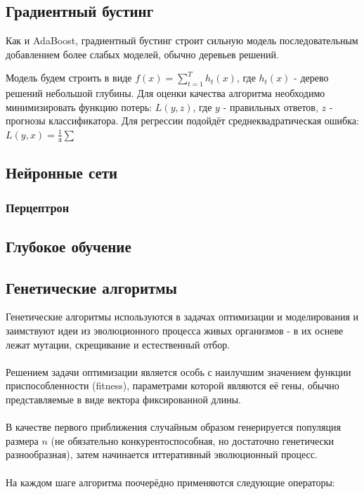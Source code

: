 \documentclass{article}
\begin{document}
    \subsection*{Градиентный бустинг}
        Как и AdaBoost, градиентный бустинг строит сильную модель последовательным добавлением более слабых моделей, обычно деревьев решений.
        
        Модель будем строить в виде $f(x) = \sum\limits_{t = 1}^T h_t(x)$, где $h_t(x)$ - дерево решений небольшой глубины.
        Для оценки качества алгоритма необходимо минимизировать функцию потерь: $L(y, z)$, где $y$ - правильных ответов, $z$ - прогнозы классификатора. Для регрессии подойдёт среднеквадратическая ошибка: $L(y, x) = \frac{1}{л} \sum$
    
    \subsection*{Нейронные сети}
        \subsubsection*{Перцептрон \citep{rosenblatt1958perceptron}}
            
    
    \subsection*{Глубокое обучение \citep{Deep_learning}}
    
    \subsection*{Генетические алгоритмы \citep{deb2002fast}}
        Генетические алгоритмы используются в задачах оптимизации и моделирования и заимствуют идеи из эволюционного процесса живых организмов - в их осневе лежат мутации, скрещивание и естественный отбор. \\\\
        Решением задачи оптимизации является особь с наилучшим значением функции приспособленности (fitness), параметрами которой являются её гены, обычно представляемые в виде вектора фиксированной длины.  \\\\
        В качестве первого приближения случайным образом генерируется популяция размера $n$ (не обязательно конкурентоспособная, но достаточно генетически разнообразная), затем начинается иттеративный эволюционный процесс. \\\\
        На каждом шаге алгоритма поочерёдно применяются следующие операторы:
        
\end{document}
